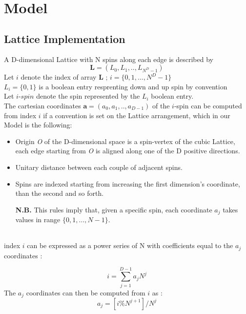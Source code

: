 \documentclass[11pt,a4paper]{article}
\begin{document}
\newpage


\section{Model}

\subsection{Lattice Implementation}

A D-dimensional Lattice with N spins along each edge is described by 
$$\mathbf{L} = (L_0,L_1,..,L_{N^D-1})$$
Let $i$ denote the index of array $\mathbf{L}$ ; $i = \{0,1,...,N^D -1\}$\\
$L_i = \{0,1\}$ is a boolean entry resprenting down and up spin by convention \\
Let $i$-$spin$ denote the spin represented by the $L_i$ boolean entry. \\
The cartesian coordinates $\mathbf{a} = (a_0,a_1,..,a_{D-1})$ of the $i$-spin can be computed from index $i$ if a convention is set on the Lattice arrangement, which in our Model is the following:
\begin{itemize}
\item Origin \textit{O} of the D-dimensional space is a spin-vertex of the cubic Lattice, each edge starting from \textit{O} is aligned along one of the D positive directions.
\item Unitary distance between each couple of adjacent spins.
\item Spins are indexed starting from increasing the first dimension’s coordinate, than the second and so forth.
\item[\textbf{N.B.}] This rules imply that, given a specific spin, each coordinate $a_j$ takes values in range $\{0,1,…,N-1\}$. \\ \\
\end{itemize}
index $i$ can be expressed as a power series of N with coefficients equal to the $a_j$ coordinates :

\begin{equation}
i = \sum_{j=1}^{D-1}a_jN^j
\end{equation}
The $a_j$ coordinates can then be computed from $i$ as :
\begin{equation}
a_j = [i\%N^{j+1}]/N^j
\end{equation}

\end{document}
